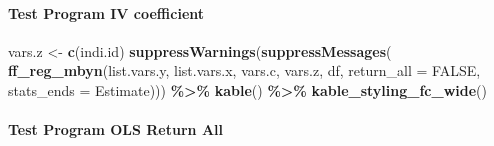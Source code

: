\documentclass[
]{book}
\newenvironment{Shaded}{\begin{snugshade}}{\end{snugshade}}
\newcommand{\DataTypeTok}[1]{\textcolor[rgb]{0.13,0.29,0.53}{#1}}
\newcommand{\KeywordTok}[1]{\textcolor[rgb]{0.13,0.29,0.53}{\textbf{#1}}}
\newcommand{\NormalTok}[1]{#1}
\newcommand{\OperatorTok}[1]{\textcolor[rgb]{0.81,0.36,0.00}{\textbf{#1}}}
\newcommand{\OtherTok}[1]{\textcolor[rgb]{0.56,0.35,0.01}{#1}}
\newcommand{\StringTok}[1]{\textcolor[rgb]{0.31,0.60,0.02}{#1}}
\begin{document}
\hypertarget{test-program-iv-coefficient}{%
\paragraph{Test Program IV coefficient}\label{test-program-iv-coefficient}}

\begin{Shaded}
\begin{Highlighting}[]
\NormalTok{vars.z \textless{}{-}}\StringTok{ }\KeywordTok{c}\NormalTok{(}\StringTok{\textquotesingle{}indi.id\textquotesingle{}}\NormalTok{)}
\KeywordTok{suppressWarnings}\NormalTok{(}\KeywordTok{suppressMessages}\NormalTok{(}
  \KeywordTok{ff\_reg\_mbyn}\NormalTok{(list.vars.y, list.vars.x,}
\NormalTok{              vars.c, vars.z, df,}
              \DataTypeTok{return\_all =} \OtherTok{FALSE}\NormalTok{,}
              \DataTypeTok{stats\_ends =} \StringTok{\textquotesingle{}Estimate\textquotesingle{}}\NormalTok{))) }\OperatorTok{\%\textgreater{}\%}
\StringTok{  }\KeywordTok{kable}\NormalTok{() }\OperatorTok{\%\textgreater{}\%}
\StringTok{  }\KeywordTok{kable\_styling\_fc\_wide}\NormalTok{()}
\end{Highlighting}
\end{Shaded}

\begin{table}[!h]
\centering
{}
\end{table}

\hypertarget{test-program-ols-return-all}{%
\paragraph{Test Program OLS Return All}\label{test-program-ols-return-all}}
\end{document}
